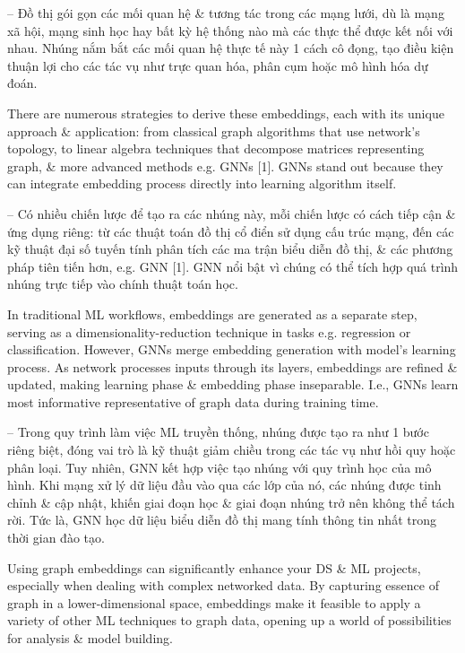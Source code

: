 \documentclass{article}
\begin{document}
\begin{itemize}
    -- Đồ thị gói gọn các mối quan hệ \& tương tác trong các mạng lưới, dù là mạng xã hội, mạng sinh học hay bất kỳ hệ thống nào mà các thực thể được kết nối với nhau. Nhúng nắm bắt các mối quan hệ thực tế này 1 cách cô đọng, tạo điều kiện thuận lợi cho các tác vụ như trực quan hóa, phân cụm hoặc mô hình hóa dự đoán.

    There are numerous strategies to derive these embeddings, each with its unique approach \& application: from classical graph algorithms that use network's topology, to linear algebra techniques that decompose matrices representing graph, \& more advanced methods e.g. GNNs [1]. GNNs stand out because they can integrate embedding process directly into learning algorithm itself.

    -- Có nhiều chiến lược để tạo ra các nhúng này, mỗi chiến lược có cách tiếp cận \& ứng dụng riêng: từ các thuật toán đồ thị cổ điển sử dụng cấu trúc mạng, đến các kỹ thuật đại số tuyến tính phân tích các ma trận biểu diễn đồ thị, \& các phương pháp tiên tiến hơn, e.g. GNN [1]. GNN nổi bật vì chúng có thể tích hợp quá trình nhúng trực tiếp vào chính thuật toán học.

    In traditional ML workflows, embeddings are generated as a separate step, serving as a dimensionality-reduction technique in tasks e.g. regression or classification. However, GNNs merge embedding generation with model's learning process. As network processes inputs through its layers, embeddings are refined \& updated, making learning phase \& embedding phase inseparable. I.e., GNNs learn most informative representative of graph data during training time.

    -- Trong quy trình làm việc ML truyền thống, nhúng được tạo ra như 1 bước riêng biệt, đóng vai trò là kỹ thuật giảm chiều trong các tác vụ như hồi quy hoặc phân loại. Tuy nhiên, GNN kết hợp việc tạo nhúng với quy trình học của mô hình. Khi mạng xử lý dữ liệu đầu vào qua các lớp của nó, các nhúng được tinh chỉnh \& cập nhật, khiến giai đoạn học \& giai đoạn nhúng trở nên không thể tách rời. Tức là, GNN học dữ liệu biểu diễn đồ thị mang tính thông tin nhất trong thời gian đào tạo.

    Using graph embeddings can significantly enhance your DS \& ML projects, especially when dealing with complex networked data. By capturing essence of graph in a lower-dimensional space, embeddings make it feasible to apply a variety of other ML techniques to graph data, opening up a world of possibilities for analysis \& model building.


\end{itemize}
\end{document}

